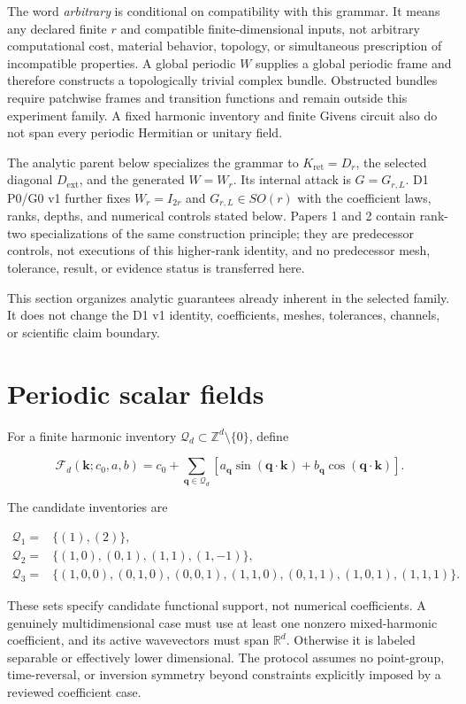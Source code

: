 \documentclass[11pt]{article}
\begin{document}
The word \emph{arbitrary} is conditional on compatibility with this grammar. It means
any declared finite $r$ and compatible finite-dimensional inputs, not arbitrary
computational cost, material behavior, topology, or simultaneous prescription of
incompatible properties. A global periodic $W$ supplies a global periodic frame and
therefore constructs a topologically trivial complex bundle. Obstructed bundles require
patchwise frames and transition functions and remain outside this experiment family. A
fixed harmonic inventory and finite Givens circuit also do not span every periodic
Hermitian or unitary field.

The analytic parent below specializes the grammar to
$K_{\mathrm{ret}}=D_r$, the selected diagonal $D_{\mathrm{ext}}$, and the generated
$W=W_r$. Its internal attack is $G=G_{r,L}$. D1 P0/G0 v1 further fixes
$W_r=I_{2r}$ and $G_{r,L}\in SO(r)$ with the coefficient laws, ranks, depths, and
numerical controls stated below. Papers 1 and 2 contain rank-two specializations of the
same construction principle; they are predecessor controls, not executions of this
higher-rank identity, and no predecessor mesh, tolerance, result, or evidence status is
transferred here.

This section organizes analytic guarantees already inherent in the selected family. It
does not change the D1 v1 identity, coefficients, meshes, tolerances, channels, or
scientific claim boundary.

\section{Periodic scalar fields}

For a finite harmonic inventory $\mathcal Q_d\subset\mathbb Z^d\setminus\{0\}$, define

\[
\mathcal F_d(\mathbf k;c_0,a,b)
=c_0+\sum_{\mathbf q\in\mathcal Q_d}
\left[
 a_{\mathbf q}\sin(\mathbf q\cdot\mathbf k)
 +b_{\mathbf q}\cos(\mathbf q\cdot\mathbf k)
\right].
\]

The candidate inventories are

\[
\begin{aligned}
\mathcal Q_1={}&\{(1),(2)\},\\
\mathcal Q_2={}&\{(1,0),(0,1),(1,1),(1,-1)\},\\
\mathcal Q_3={}&\{(1,0,0),(0,1,0),(0,0,1),
(1,1,0),(0,1,1),(1,0,1),(1,1,1)\}.
\end{aligned}
\]

These sets specify candidate functional support, not numerical coefficients. A genuinely
multidimensional case must use at least one nonzero mixed-harmonic coefficient, and its
active wavevectors must span $\mathbb R^d$. Otherwise it is labeled separable or
effectively lower dimensional. The protocol assumes no point-group, time-reversal, or
inversion symmetry beyond constraints explicitly imposed by a reviewed coefficient
case.
\end{document}
